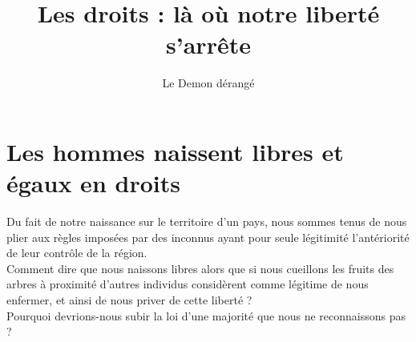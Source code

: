 \documentclass[french,amstex,12pt,a5paper]{book}
\begin{document}
\title{Les droits : là où notre liberté s'arrête}
\author{Le Demon dérangé}
\date{\vspace{-5ex}}
\maketitle

\tableofcontents

\chapter{Les hommes naissent libres et égaux en droits}


Du fait de notre naissance sur le territoire d'un pays, nous sommes tenus de nous plier aux règles imposées par des inconnus ayant pour seule légitimité l'antériorité de leur contrôle de la région.\\

Comment dire que nous naissons libres alors que si nous cueillons les fruits des arbres à proximité d'autres individus considèrent comme légitime de nous enfermer, et ainsi de nous priver de cette liberté ?\\

Pourquoi devrions-nous subir la loi d'une majorité que nous ne reconnaissons pas ?
\end{document}
